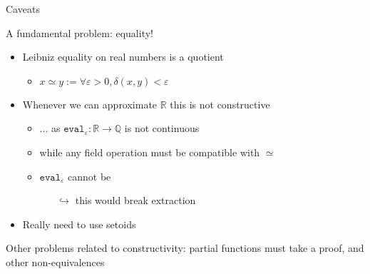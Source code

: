 \documentclass{beamer}
\begin{document}
\begin{frame}{Caveats}

A fundamental problem: \alert{equality}!

\begin{itemize}
  \item Leibniz equality on real numbers is a quotient
  \begin{itemize}
    \item $x \simeq y := \forall \varepsilon > 0, \delta(x, y) < \varepsilon $
  \end{itemize}
  \item Whenever we can approximate $\mathbb{R}$ this is not constructive
    \begin{itemize}
      \item ... as $\mathtt{eval}_\varepsilon : \mathbb{R}\rightarrow\mathbb{Q}$ is not continuous
      \item while any field operation must be compatible with $\simeq$
      \item $\mathtt{eval}_\varepsilon$ cannot be
      \begin{itemize}
	\item[$\hookrightarrow$] this would break extraction
      \end{itemize}
    \end{itemize}\pause
  \item Really need to use setoids
\end{itemize}

Other problems related to constructivity: \alert{partial} functions must take a proof, and other non-equivalences

\end{frame}
\end{document}
